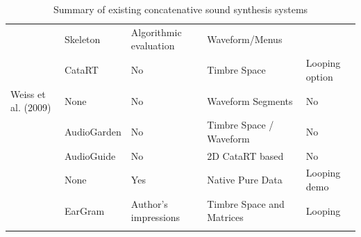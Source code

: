 \begin{table}
\begin{threeparttable}
\begin{centering}
\begin{tabular}{l l l l l}
				\cite{Jehan2005}                  & Skeleton                      & Algorithmic evaluation & Waveform/Menus               &                \\
				\cite{Schwarz2006}                & CataRT                        & No                     & Timbre Space              & Looping option \\
			    Weiss et al. (2009)           & None                          & No                     & Waveform Segments            & No             \\
				\cite{Frisson2010}         & AudioGarden                   & No                     & Timbre Space / Waveform   & No             \\
				\cite{Hackbarth2010}			& AudioGuide                    & No                     & 2D CataRT based              & No             \\
				\cite{OConnell2011}             & None                          & Yes                    & Native Pure Data             & Looping demo   \\
				\cite{Bernardes2013}            & EarGram                       & Author's impressions   & Timbre Space and Matrices & Looping			\\	
				\tablebot		
			\end{tabular}
			\par \end{centering}		
		\begin{tablenotes}
			\small
		\end{tablenotes}
			\caption[Summary of Existing Concatenative Sound Synthesis Systems]{Summary of existing concatenative sound synthesis systems}
			\label{tab:concat_system_summary}
	\end{threeparttable}
\end{table}
 